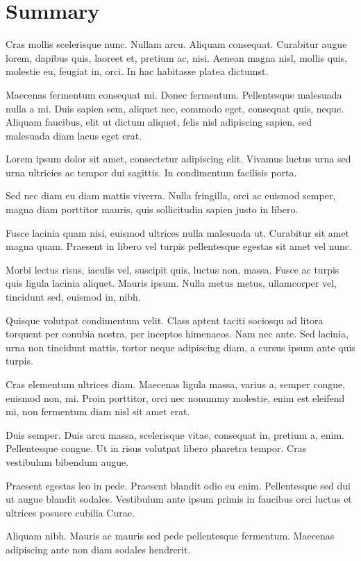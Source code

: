 \documentclass[12pt,reqno,oneside]{amsbook}
\theoremstyle{definition}
\begin{document}
\chapter*{Summary}

Cras mollis scelerisque nunc. Nullam arcu. Aliquam consequat. Curabitur augue lorem, dapibus quis, laoreet et, pretium ac, nisi. Aenean magna nisl, mollis quis, molestie eu, feugiat in, orci. In hac habitasse platea dictumst.

Maecenas fermentum consequat mi. Donec fermentum. Pellentesque malesuada nulla a mi. Duis sapien sem, aliquet nec, commodo eget, consequat quis, neque. Aliquam faucibus, elit ut dictum aliquet, felis nisl adipiscing sapien, sed malesuada diam lacus eget erat.

Lorem ipsum dolor sit amet, consectetur adipiscing elit. Vivamus luctus urna sed urna ultricies ac tempor dui sagittis. In condimentum facilisis porta.

Sed nec diam eu diam mattis viverra. Nulla fringilla, orci ac euismod semper, magna diam porttitor mauris, quis sollicitudin sapien justo in libero.

Fusce lacinia quam nisi, euismod ultrices nulla malesuada ut. Curabitur sit amet magna quam. Praesent in libero vel turpis pellentesque egestas sit amet vel nunc.

Morbi lectus risus, iaculis vel, suscipit quis, luctus non, massa. Fusce ac turpis quis ligula lacinia aliquet. Mauris ipsum. Nulla metus metus, ullamcorper vel, tincidunt sed, euismod in, nibh.

Quisque volutpat condimentum velit. Class aptent taciti sociosqu ad litora torquent per conubia nostra, per inceptos himenaeos. Nam nec ante. Sed lacinia, urna non tincidunt mattis, tortor neque adipiscing diam, a cursus ipsum ante quis turpis.

Cras elementum ultrices diam. Maecenas ligula massa, varius a, semper congue, euismod non, mi. Proin porttitor, orci nec nonummy molestie, enim est eleifend mi, non fermentum diam nisl sit amet erat.

Duis semper. Duis arcu massa, scelerisque vitae, consequat in, pretium a, enim. Pellentesque congue. Ut in risus volutpat libero pharetra tempor. Cras vestibulum bibendum augue.

Praesent egestas leo in pede. Praesent blandit odio eu enim. Pellentesque sed dui ut augue blandit sodales. Vestibulum ante ipsum primis in faucibus orci luctus et ultrices posuere cubilia Curae.

Aliquam nibh. Mauris ac mauris sed pede pellentesque fermentum. Maecenas adipiscing ante non diam sodales hendrerit.
\end{document}
